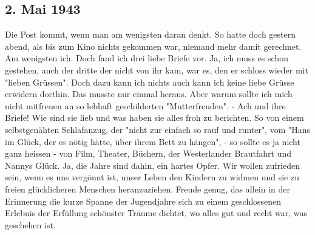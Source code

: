 \subsection{2. Mai 1943}

Die Post kommt, wenn man am wenigsten daran denkt.
So hatte doch gestern abend, als bis zum Kino nichts gekommen war, niemand mehr damit gerechnet.
Am wenigsten ich.
Doch fand ich drei liebe Briefe vor.
Ja, ich muss es schon gestehen, auch der dritte der nicht von ihr kam, war es, den er schloss wieder mit "lieben Gr\"{u}ssen".
Doch dazu kann ich nichts auch kann ich keine liebe Gr\"{u}sse erwidern dorthin.
Das musste nur einmal heraus.
Aber warum sollte ich mich nicht mitfreuen an so lebhaft geschilderten "Mutterfreuden".
- Ach und ihre Briefe!
Wie sind sie lieb und was haben sie alles froh zu berichten.
So von einem selbstgen\"{a}hten Schlafanzug, der "nicht zur einfach so rauf und runter", vom "Hans im Gl\"{u}ck, der es n\"{o}tig h\"{a}tte, \"{u}ber ihrem Bett zu h\"{a}ngen", - so sollte es ja nicht ganz heissen -  von Film, Theater, B\"{u}chern, der Westerlander Brautfahrt und Nannys Gl\"{u}ck.
Ja, die Jahre sind dahin, ein hartes Opfer.
Wir wollen zufrieden sein, wenn es uns verg\"{o}nnt ist, unser Leben den Kindern zu widmen und sie zu freien gl\"{u}cklicheren Menschen heranzuziehen.
Freude genug, das allein in der Erinnerung die kurze Spanne der Jugendjahre sich zu einem geschlossenen Erlebnis der Erf\"{u}llung sch\"{o}nster Tr\"{a}ume dichtet, wo alles gut und recht war, was geschehen ist.

\clearpage
